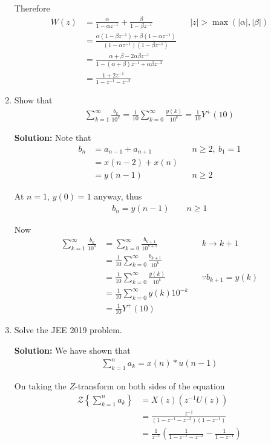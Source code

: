 \documentclass[journal,12pt,twocolumn]{IEEEtran}
\newcommand{\solution}{\noindent \textbf{Solution: }}
\providecommand{\brak}[1]{\ensuremath{\left(#1\right)}}
\providecommand{\cbrak}[1]{\ensuremath{\left\{#1\right\}}}
\providecommand{\abs}[1]{\left\vert#1\right\vert}
\providecommand{\z}[1]{{\mathcal{Z}}\cbrak{#1}}
\numberwithin{equation}{section}
\renewcommand\thesection{\arabic{section}}
\begin{document}
\begin{enumerate}[label=\thesection.\arabic*,ref=\thesection.\theenumi]
Therefore
\begin{align}
	W(z) &= \frac{\alpha}{1-\alpha z^{-1}} + \frac{\beta}{1-\beta z^{-1}} &&\abs{z}>\max(\abs{\alpha}, \abs{\beta}) \\
	&= \frac{\alpha(1-\beta z^{-1}) + \beta(1-\alpha z^{-1})}{(1-\alpha z^{-1})(1-\beta z^{-1})} \\
	&= \frac{\alpha + \beta  - 2\alpha\beta z^{-1}}{1 - (\alpha + \beta)z^{-1} + \alpha\beta z^{-2}} \\
	&= \frac{1 + 2z^{-1}}{1 - z^{-1} - z^{-2}}
\end{align}


 \item Show that 
\begin{align}
	\sum_{k=1}^{\infty}\frac{b_k}{10^k} =
	\frac{1}{10}\sum_{k=0}^{\infty}\frac{y\brak{k}}{10^k} =\frac{1}{10}Y^{+}\brak{{10}}
\end{align}

\solution Note that
\begin{align}
	b_n &= a_{n-1} + a_{n+1} && n \ge 2, ~b_1 =1 \\
	&= x(n-2) + x(n) \\
	&= y(n-1) && n \ge 2
\end{align}

At $n=1$, $y(0) = 1$ anyway, thus
\begin{align}
	b_n = y(n-1) \qquad n \ge 1
\end{align}

Now
\begin{align}
    \sum_{k=1}^{\infty}\frac{b_k}{10^k} 
    &= \sum_{k = 0}^{\infty}\frac{b_{k+1}}{10^{k+1}} && k \rightarrow k + 1 \\
    &= \frac{1}{10}\sum_{k = 0}^{\infty}\frac{b_{k+1}}{10^k} \\
    &= \frac{1}{10}\sum_{k = 0}^{\infty}\frac{y(k)}{10^k} &&\because b_{k+1} = y(k) \\
    &= \frac{1}{10}\sum_{k = 0}^{\infty} y(k) 10^{-k} \\
    &= \frac{1}{10}Y^+(10) 
\end{align}

\item Solve the JEE 2019 problem.

\solution We have shown that
\begin{align}
    \sum_{k = 1}^{n}a_k = x(n)*u(n - 1)
\end{align}

On taking the $Z$-transform on both sides of the equation
\begin{align}
    \z{\sum_{k = 1}^{n}a_k} &= X(z) \brak{z^{-1} U(z)} \\
    &= \frac{z^{-1}}{\brak{1 - z^{-1} - z^{-2}}\brak{1 - z^{-1}}} \\
    &= \frac{1}{z^{-1}}\brak{\frac{1}{1 - z^{-1} - z^{-2}} - \frac{1}{1 - z^{-1}}} 
\end{align}


\end{enumerate}
\end{document}
